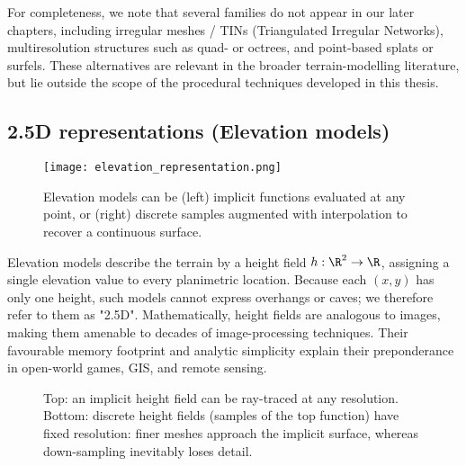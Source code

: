 For completeness, we note that several families do not appear in our later chapters, including irregular meshes / TINs (Triangulated Irregular Networks), multiresolution structures such as quad- or octrees, and point-based splats or surfels.
These alternatives are relevant in the broader terrain-modelling literature, but lie outside the scope of the procedural techniques developed in this thesis.

\subsection{2.5D representations (Elevation models)}

\begin{figure}
  \centering
  \texttt{[image: elevation\_representation.png]}
  \caption{Elevation models can be (left) implicit functions evaluated at any point, or (right) discrete samples augmented with interpolation to recover a continuous surface.}
  \label{fig:erosion-elevation-representation}
\end{figure}

Elevation models describe the terrain by a height field
$h : \R^{2}  \to  \R$, assigning a single elevation value to every planimetric location. Because each $(x,y)$ has only one height, such models cannot express overhangs or caves; we therefore refer to them as "2.5D". Mathematically, height fields are analogous to images, making them amenable to decades of image-processing techniques. Their favourable memory footprint and analytic simplicity explain their preponderance in open-world games, GIS, and remote sensing.

\begin{figure}
    \caption{Top: an implicit height field can be ray-traced at any resolution. Bottom: discrete height fields (samples of the top
    function) have fixed resolution: finer meshes approach the implicit surface, whereas down-sampling inevitably loses detail.}
    \label{fig:sota-representations-heights-resolutions}
\end{figure}


